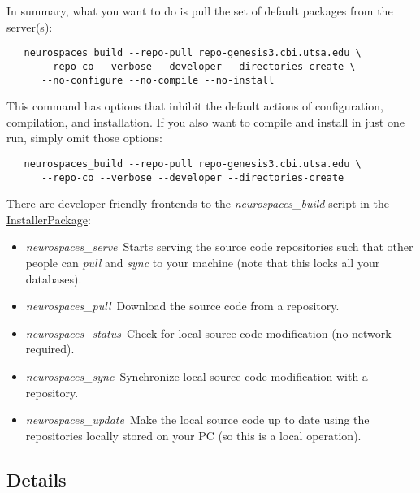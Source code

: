 \documentclass[12pt]{article}
\begin{document}
In summary, what you want to do is pull the set of default packages from the server(s):
\begin{verbatim}
   neurospaces_build --repo-pull repo-genesis3.cbi.utsa.edu \
      --repo-co --verbose --developer --directories-create \
      --no-configure --no-compile --no-install
\end{verbatim}
This command has options that inhibit the default actions of configuration, compilation, and installation. If you also want to compile and install in just one run, simply omit those options:
\begin{verbatim}
   neurospaces_build --repo-pull repo-genesis3.cbi.utsa.edu \
      --repo-co --verbose --developer --directories-create
\end{verbatim}
There are developer friendly frontends to the {\it neurospaces\_build} script in the \href{../installer-package/installer-package.tex}{InstallerPackage}:
\begin{itemize}
\item {\it neurospaces\_serve}\,\,\,Starts serving the source code repositories such that other people can {\it pull} and {\it sync} to your machine (note that this locks all your databases).
\item {\it neurospaces\_pull}\,\,\,Download the source code from a repository.
\item {\it neurospaces\_status}\,\,\,Check for local source code modification (no network required).
\item {\it neurospaces\_sync}\,\,\,Synchronize local source code modification with a repository.
\item {\it neurospaces\_update}\,\,\,Make the local source code up to date using the repositories locally stored on your PC (so this is a local operation). 
\end{itemize}

\subsection*{Details}
\end{document}

